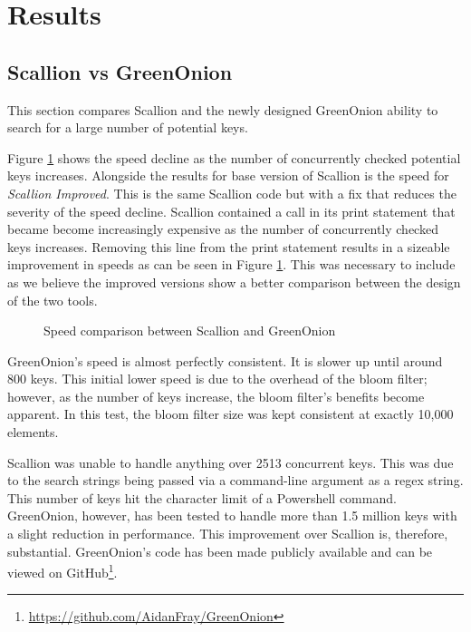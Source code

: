 \section{Results}


\subsection{Scallion vs GreenOnion}
\label{sec:SvG}

This section compares Scallion and the newly designed GreenOnion ability to search for a large number of potential keys.

Figure \ref{tab:scallion_speed} shows the speed decline as the number of concurrently checked potential keys increases. Alongside the results for base version of Scallion is the speed for \textit{Scallion Improved}. This is the same Scallion code but with a fix that reduces the severity of the speed decline. Scallion contained a call in its print statement that became become increasingly expensive as the number of concurrently checked keys increases. Removing this line from the print statement results in a sizeable improvement in speeds as can be seen in Figure \ref{tab:scallion_speed}. This was necessary to include as we believe the improved versions show a better comparison between the design of the two tools. 

\begin{figure}[h!]
    \centering
    
    \label{tab:scallion_speed}
    \caption{Speed comparison between Scallion and GreenOnion}
\end{figure}

GreenOnion's speed is almost perfectly consistent. It is slower up until  around 800 keys. This initial lower speed is due to the overhead of the bloom filter; however, as the number of keys increase, the bloom filter's benefits become apparent. In this test, the bloom filter size was kept consistent at exactly 10,000 elements. 

Scallion was unable to handle anything over 2513 concurrent keys. This was due to the search strings being passed via a command-line argument as a regex string. This number of keys hit the character limit of a Powershell command. GreenOnion, however, has been tested to handle more than 1.5 million keys with a slight reduction in performance. This improvement over Scallion is, therefore, substantial. GreenOnion's code has been made publicly available and can be viewed on GitHub\footnote{\url{https://github.com/AidanFray/GreenOnion}}.

